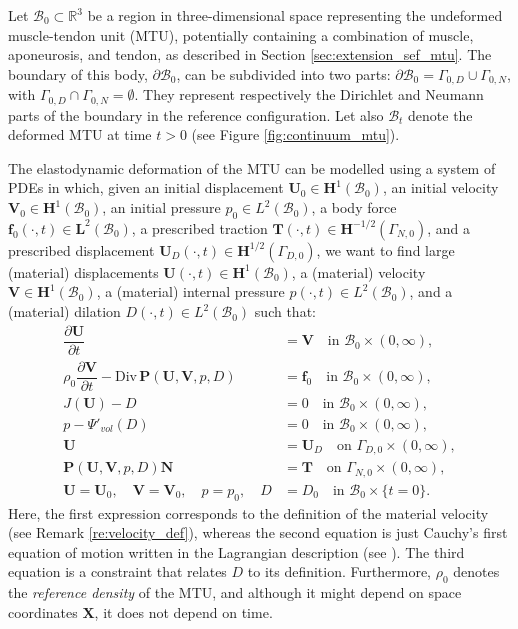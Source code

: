 \documentclass{sfuthesis}
\numberwithin{equation}{section}
\numberwithin{figure}{chapter}
\numberwithin{table}{chapter}
\theoremstyle{definition}
\def\*#1{{\mathbf{#1}}} %
\newcommand{\pder}[2]{\dfrac{\partial #1}{\partial #2}}
\newcommand{\Divt}[1]{{\bm{\mathrm{Div}} \, #1}}
\newcommand{\R}{\mathbb{R}}
\newcommand{\B}{\mathcal{B}}
\begin{document}
Let $\B_0 \subset \R^3$ be a region in three-dimensional space representing the undeformed muscle-tendon unit (MTU), potentially containing a combination of muscle, aponeurosis, and tendon, as described in Section \ref{sec:extension_sef_mtu}. The boundary of this body, $\partial \B_0$, can be subdivided into two parts: $\partial \B_0 = \Gamma_{0,D} \cup \Gamma_{0,N}$, with $\Gamma_{0,D} \cap \Gamma_{0,N} = \emptyset$. They represent respectively the Dirichlet and Neumann parts of the boundary in the reference configuration. Let also $\B_t$ denote the deformed MTU at time $t > 0$ (see Figure \ref{fig:continuum_mtu}).

The elastodynamic deformation of the MTU can be modelled using a system of PDEs in which, given an initial displacement $\*U_0 \in \*H^1(\B_0)$, an initial velocity $\*V_0 \in \*H^1(\B_0)$, an initial pressure $p_0 \in L^2(\B_0)$, a body force $\*f_0(\cdot, t) \in \*L^2(\B_0)$, a prescribed traction $\*T(\cdot,t) \in \*H^{-1/2}(\Gamma_{N,0})$, and a prescribed displacement $\*U_D(\cdot, t) \in \*H^{1/2}(\Gamma_{D,0})$, we want to find large (material) displacements $\*U(\cdot,t) \in \*H^1(\B_0)$, a (material) velocity $\*V \in \*H^1(\B_0)$, a (material) internal pressure $p(\cdot,t) \in L^2(\B_0)$, and a (material) dilation $D(\cdot, t) \in L^2(\B_0)$ such that:
\begin{subequations} \label{eq:LF_main_system}
    \begin{align}
        \label{eq:LF_main_system_1}\pder{\*U}{t} &= \*V  \quad \text{in } \B_0 \times (0,\infty),\\
        \label{eq:LF_main_system_2}\rho_0 \pder{\*V}{t} - \Divt{\*P(\*U,\*V,p,D)} &= \*f_0 \quad \text{in } \B_0 \times (0,\infty), \\
        \label{eq:LF_main_system_3}J(\*U) - D &= 0 \quad \text{in } \B_0 \times (0,\infty), \\
        \label{eq:LF_main_system_4}p-\Psi'_{vol}(D) &= 0 \quad \text {in } \B_0 \times (0,\infty), \\
        \*U &= \*U_D \quad \text{on } \Gamma_{D,0} \times (0,\infty), \\
        \label{eq:bc_traction_0}\*P(\*U,\*V,p,D) \*N &= \*T \quad \text{on }\Gamma_{N,0} \times (0,\infty), \\
        \*U = \*U_0, \quad \*V=\*V_0, \quad p=p_0, \quad D &= D_0 \quad \text{in } \B_0 \times \{t=0\}.
    \end{align}
\end{subequations}
Here, the first expression corresponds to the definition of the material velocity (see Remark \ref{re:velocity_def}), whereas the second equation is just Cauchy's first equation of motion written in the Lagrangian description (see \cite[Section 4.3]{HolzapfelBook}). 
The third equation is a constraint that relates $D$ to its definition.
Furthermore, $\rho_0$ denotes the \textit{reference density} of the MTU, and although it might depend on space coordinates $\*X$, it does not depend on time.
\end{document}
